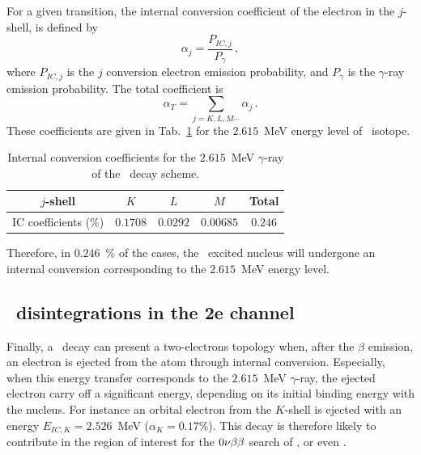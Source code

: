 For a given transition, the internal conversion coefficient of the electron in the $j$-shell, is defined by
\begin{equation}
\alpha_{j}=\frac{P_{IC, j}}{P_{\gamma}}\,,
\end{equation}
where $P_{IC,j}$ is the $j$ conversion electron emission probability, and $P_{\gamma}$ is the $\gamma$-ray emission probability.
The total coefficient is
\begin{equation}
  \alpha_{T}=\sum_{j=K,L,M\cdots}\alpha_{j}\,.
\end{equation}
These coefficients are given in Tab.~\ref{tab:IC_prob} for the $2.615$~MeV energy level of \Tl\ isotope.
\begin{table}[!h]
  \centering
  \begin{tabular}{|c|c|c|c|c|}
    \hline
    $j$-shell & $K$ & $L$ & $M$ & Total \\
    \hline\hline
    IC coefficients (\%) & $0.1708$ & $0.0292$ & $0.00685$ & $0.246$ \\
    \hline
  \end{tabular}
  \caption{Internal conversion coefficients for the $2.615$~MeV $\gamma$-ray of the \Tl\ decay scheme.
    \label{tab:IC_prob}}
\end{table}
Therefore, in $0.246$~\% of the cases, the \Pb\ excited nucleus will undergone an internal conversion corresponding to the $2.615$~MeV energy level.


\subsection{\Tl\ disintegrations in the 2e channel}

Finally, a \Tl\ decay can present a two-electrons topology when, after the $\beta$ emission, an electron is ejected from the atom through internal conversion.
Especially, when this energy transfer corresponds to the $2.615$~MeV $\gamma$-ray, the ejected electron carry off a significant energy, depending on its initial binding energy with the nucleus.
For instance an orbital electron from the $K$-shell is ejected with an energy $E_{IC,K}=2.526$~MeV (${\alpha_{K}=0.17}$\%).
This decay is therefore likely to contribute in the region of interest for the $0\nu\beta\beta$ search of \Se, or even \Nd.

